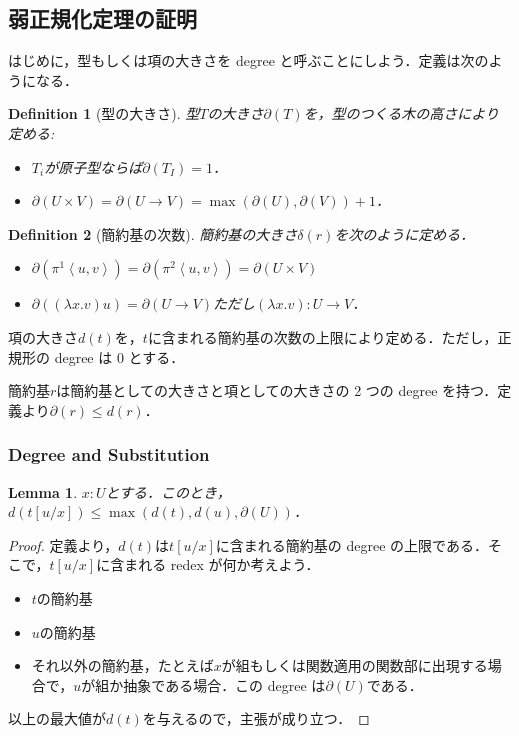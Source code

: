 \documentclass[a4paper,10pt,platex, dvipdfmx]{jsarticle}
\newtheorem{definition}{Definition}
\newtheorem{lemma}{Lemma}
\begin{document}
\subsection{弱正規化定理の証明}
はじめに，型もしくは項の大きさを degree と呼ぶことにしよう．定義は次のようになる．
\begin{definition}[型の大きさ]
型$T$の大きさ$\partial(T)$を，型のつくる木の高さにより定める:\begin{itemize}
\item $T_{i}$が原子型ならば$\partial(T_{I}) = 1$．
\item $\partial(U\times V) = \partial(U\rightarrow V) = \max(\partial(U), \partial(V)) + 1$．
\end{itemize}
\end{definition}
\begin{definition}[簡約基の次数]
    簡約基の大きさ$\delta(r)$を次のように定める．
\begin{itemize}
\item $\partial(\pi^{1}\left<u, v\right>) = \partial(\pi^{2}\left<u, v\right>) = \partial(U\times V)$
\item $\partial((\lambda x . v) u) = \partial(U\rightarrow V)$ただし$(\lambda x. v): U\rightarrow V$．
\end{itemize}
\end{definition}
項の大きさ$d(t)$を，$t$に含まれる簡約基の次数の上限により定める．ただし，正規形の degree は 0 とする．

\dbend 簡約基$r$は簡約基としての大きさと項としての大きさの 2 つの degree を持つ．定義より$\partial(r) \leq d(r)$．

\subsubsection{Degree and Substitution}
\begin{lemma}
    $x:U$とする．このとき，$d(t\left[u/x\right])\leq \max(d(t), d(u), \partial(U))$．
\end{lemma}
\begin{proof}
定義より，$d(t)$は$t\left[u/x\right]$に含まれる簡約基の degree の上限である．そこで，$t\left[u/x\right]$に含まれる redex が何か考えよう．\begin{itemize}
\item $t$の簡約基
\item $u$の簡約基
\item それ以外の簡約基，たとえば$x$が組もしくは関数適用の関数部に出現する場合で，$u$が組か抽象である場合．この degree は$\partial(U)$である．
\end{itemize}
以上の最大値が$d(t)$を与えるので，主張が成り立つ．
\end{proof}
\end{document}
